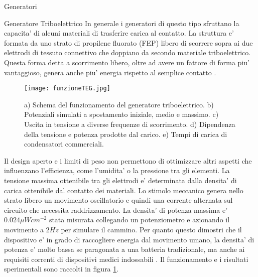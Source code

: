 \begin{section}{Generatori}
    \begin{subsection}{Generatore Triboelettrico}
        In generale i generatori di questo tipo sfruttano la capacita' di alcuni materiali di trasferire carica al contatto. La struttura e' formata da uno strato di propilene fluorato (FEP) libero di scorrere sopra ai due elettrodi di tessuto connettivo che doppiano da secondo materiale triboelettrico. Questa forma detta a scorrimento libero, oltre ad avere un fattore di forma piu' vantaggioso, genera anche piu' energia rispetto al semplice contatto \cite{fuAchievingUltraDurabilityHigh2024}. 
        \begin{figure}[H]
            \texttt{[image: funzioneTEG.jpg]}
            \centering
            \caption{a) Schema del funzionamento del generatore triboelettrico. b) Potenziali simulati a spostamento iniziale, medio e massimo. c) Uscita in tensione a diverse frequenze di scorrimento. d) Dipendenza della tensione e potenza prodotte dal carico. e) Tempi di carica di condensatori commerciali.\cite{kouWearableAllFabricHybrid2024}}
            \label{fig:funzioneTEG}
        \end{figure}
        Il design aperto e i limiti di peso non permettono di ottimizzare altri aspetti che influenzano l'efficienza, come l'umidita' o la pressione tra gli elementi. La tensione massima ottenibile tra gli elettrodi e' determinata dalla densita' di carica ottenibile dal contatto dei materiali. Lo stimolo meccanico genera nello strato libero un movimento oscillatorio e quindi una corrente alternata sul circuito che necessita raddrizzamento. La densita' di potenza massima e' \(0.024\mu Wcm^{-2}\) stata misurata collegando un potenziometro e azionando il movimento a \(2Hz\) per simulare il cammino. Per quanto questo dimostri che il dispositivo e' in grado di raccogliere energia dal movimento umano, la densita' di potenza e' molto bassa se paragonata a una batteria tradizionale, ma anche ai requisiti correnti di dispositivi medici indossabili \cite{gaoAdvancedEnergyHarvesters2024}. Il funzionamento e i risultati sperimentali sono raccolti in figura \ref{fig:funzioneTEG}.
        
    \end{subsection}
    

\end{section}
